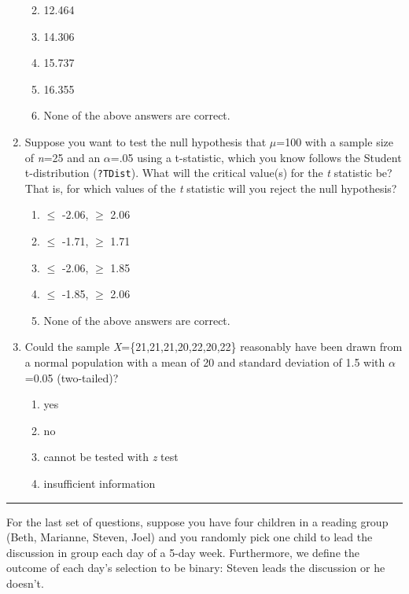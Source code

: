 \documentclass[]{article}
\begin{document}
\begin{enumerate}
  \begin{enumerate}
  \def\labelenumii{\alph{enumii}.}
  \item
    12.464
  \item
    14.306
  \item
    15.737
  \item
    16.355
  \item
    None of the above answers are correct.
  \end{enumerate}
\item
  Suppose you want to test the null hypothesis that \(\mu\)=100 with a
  sample size of \emph{n}=25 and an \(\alpha\)=.05 using a t-statistic,
  which you know follows the Student t-distribution (\texttt{?TDist}).
  What will the critical value(s) for the \emph{t} statistic be? That
  is, for which values of the \emph{t} statistic will you reject the
  null hypothesis?

  \begin{enumerate}
  \def\labelenumii{\alph{enumii}.}
  \item
    \(\leq\) -2.06, \(\geq\) 2.06
  \item
    \(\leq\) -1.71, \(\geq\) 1.71
  \item
    \(\leq\) -2.06, \(\geq\) 1.85
  \item
    \(\leq\) -1.85, \(\geq\) 2.06
  \item
    None of the above answers are correct.
  \end{enumerate}
\item
  Could the sample \emph{X}=\{21,21,21,20,22,20,22\} reasonably have
  been drawn from a normal population with a mean of 20 and standard
  deviation of 1.5 with \(\alpha\)=0.05 (two-tailed)?

  \begin{enumerate}
  \def\labelenumii{\alph{enumii}.}
  \item
    yes
  \item
    no
  \item
    cannot be tested with \emph{z} test
  \item
    insufficient information
  \end{enumerate}
\end{enumerate}

\begin{center}\rule{0.5\linewidth}{\linethickness}\end{center}

For the last set of questions, suppose you have four children in a
reading group (Beth, Marianne, Steven, Joel) and you randomly pick one
child to lead the discussion in group each day of a 5-day week.
Furthermore, we define the outcome of each day's selection to be binary:
Steven leads the discussion or he doesn't.
\end{document}
